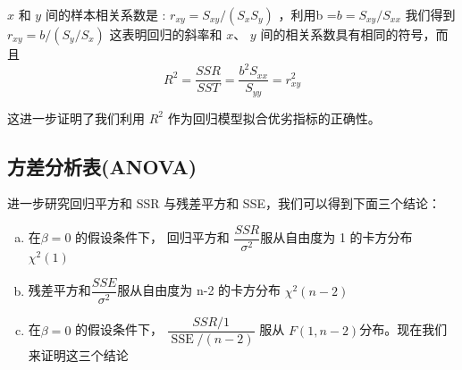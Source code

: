     $x$ 和 $y$ 间的样本相关系数是 : $ r_{x y}=S_{x y} /\left(S_{x} S_{y}\right) $ ，利用b =$ b=S_{x y} / S_{x x} $ 我们得到 $r_{x y}=b /\left(S_{y} / S_{x}\right)$
    这表明回归的斜率和 $x$、 $y$ 间的相关系数具有相同的符号，而且
    $$ R^{2}=\frac{S S R}{S S T}=\frac{b^{2} S_{x x}}{S_{y y}}=r_{x y}^{2}  $$

    这进一步证明了我们利用 $R^{2}$ 作为回归模型拟合优劣指标的正确性。
 \subsection{方差分析表(ANOVA)}

 进一步研究回归平方和 SSR 与残差平方和 SSE，我们可以得到下面三个结论：
 \begin{enumerate}[a)]
    \item 在$ \beta = 0 $ 的假设条件下， 回归平方和 $\dfrac{S S R}{\sigma^{2}}$服从自由度为 1 的卡方分布  $ \chi ^{2}(1) $
    \item 残差平方和$\dfrac{S S E}{\sigma^{2}}$服从自由度为 n-2 的卡方分布 $\chi ^{2}(n-2)$
    \item 在$ \beta = 0 $ 的假设条件下， $ \dfrac{S S R / 1}{\operatorname{SSE} /(n-2)} $ 服从 $F(1,n-2)$分布。现在我们来证明这三个结论
 \end{enumerate} 

